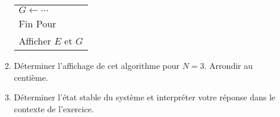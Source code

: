 \begin{enumerate}
\begin{enumerate}[label=\alph*.]
\begin{center}
\begin{extern}
\begin{tabular}{|l|}
                         \hspace*{1cm} $G \longleftarrow \cdots$\\
                         Fin Pour\\
                         Afficher $E$ et $G$\\
                         \hline
                    \end{tabular}
               \end{extern}
          \end{center}
          \item Déterminer l'affichage de cet algorithme pour $N=3$. Arrondir au centième.
          \par
          \item Déterminer l'état stable du système et interpréter votre réponse dans le contexte de l'exercice.
     \end{enumerate}
\end{enumerate}
\par
